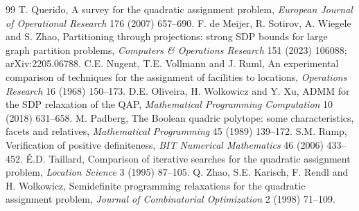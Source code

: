 \documentclass[10pt]{article}
\theoremstyle{remark}
\begin{document}
{\begin{thebibliography}{99}
  T. Querido, A survey for the quadratic assignment problem, \emph{European Journal
  of Operational Research} 176 (2007) 657--690.
 F. de Meijer, R. Sotirov, A. Wiegele and S. Zhao, Partitioning
  through projections: strong SDP bounds for large graph partition problems,
  \emph{Computers \& Operations Research} 151 (2023) 106088; arXiv:2205.06788.
 C.E. Nugent, T.E. Vollmann and J. Ruml, An experimental comparison of
  techniques for the assignment of facilities to locations, \emph{Operations
  Research} 16 (1968) 150--173.
 D.E. Oliveira, H. Wolkowicz and Y. Xu, ADMM for the SDP relaxation of
  the QAP, \emph{Mathematical Programming Computation} 10 (2018) 631--658.
 M. Padberg, The Boolean quadric polytope: some characteristics,
  facets and relatives, \emph{Mathematical Programming} 45 (1989) 139--172.
 S.M. Rump, Verification of positive definiteness, \emph{BIT
  Numerical Mathematics} 46 (2006) 433--452.
 \'E.D. Taillard, Comparison of iterative searches for the quadratic
  assignment problem, \emph{Location Science} 3 (1995) 87--105.
 Q. Zhao, S.E. Karisch, F. Rendl and H. Wolkowicz, Semidefinite
  programming relaxations for the quadratic assignment problem, \emph{Journal of
  Combinatorial Optimization} 2 (1998) 71--109.
\end{thebibliography}}
\end{document}
